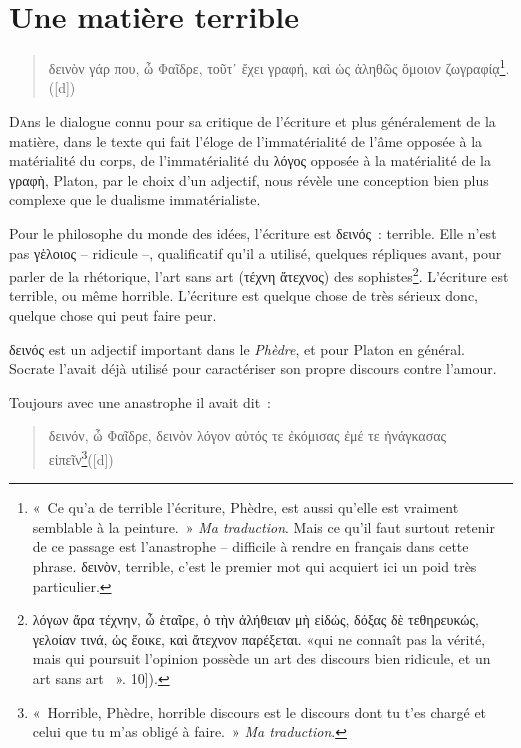 \hypertarget{une-matiuxe8re-terrible}{%
\chapter{Une matière terrible}\label{une-matiuxe8re-terrible}}

\begin{quote}
δεινὸν γάρ που, ὦ Φαῖδρε, τοῦτ᾽ ἔχει γραφή, καὶ ὡς ἀληθῶς ὅμοιον
ζωγραφίᾳ\footnote{«~Ce qu'a de terrible l'écriture, Phèdre, est aussi
  qu'elle est vraiment semblable à la peinture.~» \emph{Ma traduction}.
  Mais ce qu'il faut surtout retenir de ce passage est l'anastrophe --
  difficile à rendre en français dans cette phrase. δεινὸν, terrible,
  c'est le premier mot qui acquiert ici un poid très particulier.}.
([d])
\end{quote}

\lettrine{D}ans le dialogue connu pour sa critique de l'écriture et plus
généralement de la matière, dans le texte qui fait l'éloge de
l'immatérialité de l'âme opposée à la matérialité du corps, de
l'immatérialité du λόγος opposée à la matérialité de la γραφὴ, Platon,
par le choix d'un adjectif, nous révèle une conception bien plus
complexe que le dualisme immatérialiste.

Pour le philosophe du monde des idées, l'écriture est δεινός~: terrible.
Elle n'est pas γἑλοιος -- ridicule --, qualificatif qu'il a utilisé,
quelques répliques avant, pour parler de la rhétorique, l'art sans art
(τέχνη ἄτεχνος) des sophistes\footnote{λόγων ἄρα τέχνην, ὦ ἑταῖρε, ὁ τὴν
  ἀλήθειαν μὴ εἰδώς, δόξας δὲ τεθηρευκώς, γελοίαν τινά, ὡς ἔοικε, καὶ
  ἄτεχνον παρέξεται. «\Celui qui ne connaît pas la vérité, mais qui
  poursuit l'opinion possède un art des discours bien ridicule, et un
  art sans art ~». \Plato[Phèdre]{262b}{[}10{]}).}. L'écriture est
terrible, ou même horrible. L'écriture est quelque chose de très sérieux
donc, quelque chose qui peut faire peur.

δεινός est un adjectif important dans le \emph{Phèdre}, et pour Platon
en général. Socrate l'avait déjà utilisé pour caractériser son propre
discours contre l'amour.

Toujours avec une anastrophe il avait dit~:

\begin{quote}
δεινόν, ὦ Φαῖδρε, δεινὸν λόγον αὐτός τε ἐκόμισας ἐμέ τε ἠνάγκασας
εἰπεῖν\footnote{«~Horrible, Phèdre, horrible discours est le discours
  dont tu t'es chargé et celui que tu m'as obligé à faire.~» \emph{Ma
  traduction}.}([d])
\end{quote}

